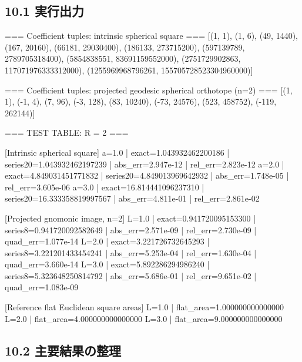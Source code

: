 \documentclass[
  12pt,
  a4paper,
]{article}
\newenvironment{Shaded}{}{}
\newcommand{\NormalTok}[1]{#1}
\begin{document}
\subsection{10.1 実行出力}\label{ux5b9fux884cux51faux529b}

\begin{Shaded}
\begin{Highlighting}[]
\NormalTok{=== Coefficient tuples: intrinsic spherical square ===}
\NormalTok{[(1, 1), (1, 6), (49, 1440), (167, 20160), (66181, 29030400), (186133, 273715200), (597139789, 2789705318400), (5854838551, 83691159552000), (2751729902863, 117071976333312000), (1255969968796261, 155705728523304960000)]}

\NormalTok{=== Coefficient tuples: projected geodesic spherical orthotope (n=2) ===}
\NormalTok{[(1, 1), ({-}1, 4), (7, 96), ({-}3, 128), (83, 10240), ({-}73, 24576), (523, 458752), ({-}119, 262144)]}

\NormalTok{=== TEST TABLE: R = 2 ===}

\NormalTok{[Intrinsic spherical square]}
\NormalTok{a=1.0 | exact=1.043932462200186 | series20=1.043932462197239 | abs\_err=2.947e{-}12 | rel\_err=2.823e{-}12}
\NormalTok{a=2.0 | exact=4.849031451771832 | series20=4.849013969642932 | abs\_err=1.748e{-}05 | rel\_err=3.605e{-}06}
\NormalTok{a=3.0 | exact=16.814441096237310 | series20=16.333358819997567 | abs\_err=4.811e{-}01 | rel\_err=2.861e{-}02}

\NormalTok{[Projected gnomonic image, n=2]}
\NormalTok{L=1.0 | exact=0.941720095153300 | series8=0.941720092582649 | abs\_err=2.571e{-}09 | rel\_err=2.730e{-}09 | quad\_err=1.077e{-}14}
\NormalTok{L=2.0 | exact=3.221726732645293 | series8=3.221201433454241 | abs\_err=5.253e{-}04 | rel\_err=1.630e{-}04 | quad\_err=3.660e{-}14}
\NormalTok{L=3.0 | exact=5.892286294986240 | series8=5.323648250814792 | abs\_err=5.686e{-}01 | rel\_err=9.651e{-}02 | quad\_err=1.083e{-}09}

\NormalTok{[Reference flat Euclidean square areas]}
\NormalTok{L=1.0 | flat\_area=1.000000000000000}
\NormalTok{L=2.0 | flat\_area=4.000000000000000}
\NormalTok{L=3.0 | flat\_area=9.000000000000000}
\end{Highlighting}
\end{Shaded}

\subsection{10.2
主要結果の整理}\label{ux4e3bux8981ux7d50ux679cux306eux6574ux7406}
\end{document}

